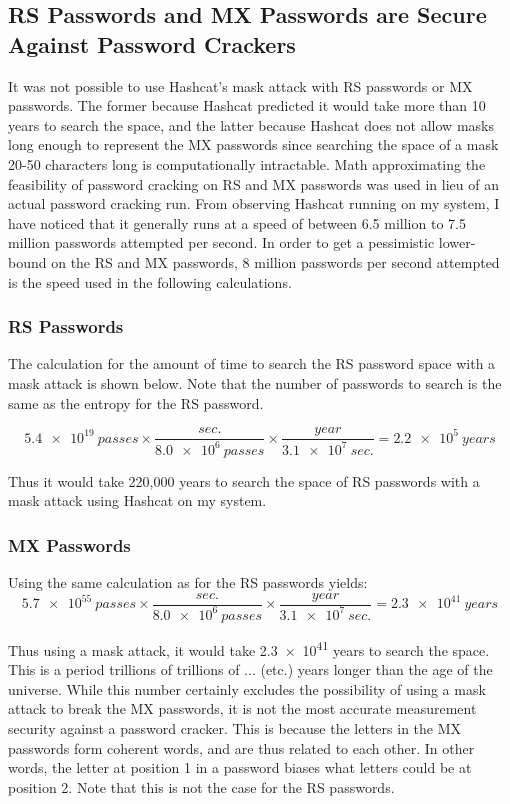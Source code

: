 \documentclass{article}
\begin{document}
\subsection*{RS Passwords and MX Passwords are Secure Against Password Crackers}
It was not possible to use Hashcat's mask attack with RS passwords or MX passwords. The former because Hashcat predicted it would take more than 10 years to search the space, and the latter because Hashcat does not allow masks long enough to represent the MX passwords since searching the space of a mask 20-50 characters long is computationally intractable. Math approximating the feasibility of password cracking on RS and MX passwords was used in lieu of an actual password cracking run. From observing Hashcat running on my system, I have noticed that it generally runs at a speed of between 6.5 million to 7.5 million passwords attempted per second. In order to get a pessimistic lower-bound on the RS and MX passwords, 8 million passwords per second attempted is the speed used in the following calculations. 

\subsubsection*{RS Passwords}
The calculation for the amount of time to search the RS password space with a mask attack is shown below. Note that the number of passwords to search is the same as the entropy for the RS password.

$$\num{5.4e19}~passes \times \frac{sec.}{\num{8.0e6}~passes} \times \frac{year}{\num{3.1e7}~sec.} = \num{2.2e5}~years$$

Thus it would take 220,000 years to search the space of RS passwords with a mask attack using Hashcat on my system.

\subsubsection*{MX Passwords}
Using the same calculation as for the RS passwords yields:
$$\num{5.7e55}~passes \times \frac{sec.}{\num{8.0e6}~passes} \times \frac{year}{\num{3.1e7}~sec.} = \num{2.3e41}~years$$

Thus using a mask attack, it would take \num{2.3e41} years to search the space. This is a period trillions of trillions of ... (etc.) years longer than the age of the universe. While this number certainly excludes the possibility of using a mask attack to break the MX passwords, it is not the most accurate measurement security against a password cracker. This is because the letters in the MX passwords form coherent words, and are thus related to each other. In other words, the letter at position 1 in a password biases what letters could be at position 2. Note that this is not the case for the RS passwords. 
\end{document}
